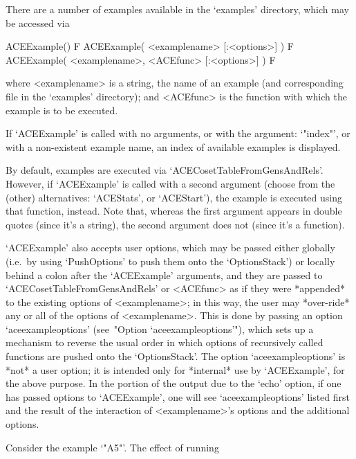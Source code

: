 
\beginitems

There are a number of examples available in the `examples'  directory,
which may be accessed via

\>ACEExample() F
\>ACEExample( <examplename> [:<options>] ) F
\>ACEExample( <examplename>, <ACEfunc> [:<options>] ) F

where  <examplename>  is  a  string,  the  name  of  an  example  (and
corresponding file in the `examples' directory); and <ACEfunc> is  the
{\ACE} function with which the example is to be executed. 

If `ACEExample' is called with no arguments,  or  with  the  argument:
`"index"', or with a non-existent example name, an index of  available
examples is displayed.

By default, examples are executed via  `ACECosetTableFromGensAndRels'.
However, if `ACEExample' is called with a second argument (choose from
the (other) alternatives: `ACEStats', or `ACEStart'), the  example  is
executed using that function, instead. Note that,  whereas  the  first
argument appears in double quotes (since it's a  string),  the  second
argument does not (since it's a function).

`ACEExample' also accepts user options, which  may  be  passed  either
globally  (i.e.~by  using  `PushOptions'  to  push   them   onto   the
`OptionsStack') or locally  behind  a  colon  after  the  `ACEExample'
arguments, and they are passed  to  `ACECosetTableFromGensAndRels'  or
<ACEfunc> as if they  were  *appended*  to  the  existing  options  of
<examplename>; in this way, the user may *over-ride* any or all of the
options  of  <examplename>.  This  is  done  by  passing   an   option
`aceexampleoptions' (see~"Option `aceexampleoptions'"), which sets  up
a mechanism to reverse the usual order in which options of recursively
called functions  are  pushed  onto  the  `OptionsStack'.  The  option
`aceexampleoptions' is *not* a user option; it is  intended  only  for
*internal* use by `ACEExample', for the above purpose. In the  portion
of the output due to the `echo' option, if one has passed  options  to
`ACEExample', one will see `aceexampleoptions' listed  first  and  the
result  of  the  interaction  of  <examplename>'s  options   and   the
additional options.

Consider the example `"A5"'. The effect of running

